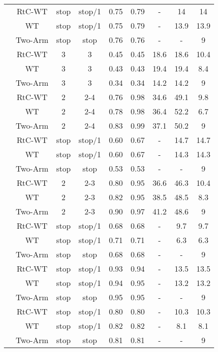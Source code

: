 \begin{longtable}[t]{ccccccccc}
	\cmidrule{1-9}\pagebreak[0]
	& RtC-WT & stop & stop/1 & 0.75 & 0.79 & - & 14 & 14\\
	\nopagebreak
	& WT & stop & stop/1 & 0.75 & 0.79 & - & 13.9 & 13.9\\
	\nopagebreak
	\multirow{-3}{*}{\centering\arraybackslash 8} & Two-Arm & stop & stop & 0.76 & 0.76 & - & - & 9\\
	\cmidrule{1-9}\pagebreak[0]
	& RtC-WT & 3 & 3 & 0.45 & 0.45 & 18.6 & 18.6 & 10.4\\
	\nopagebreak
	& WT & 3 & 3 & 0.43 & 0.43 & 19.4 & 19.4 & 8.4\\
	\nopagebreak
	\multirow{-3}{*}{\centering\arraybackslash 9} & Two-Arm & 3 & 3 & 0.34 & 0.34 & 14.2 & 14.2 & 9\\
	\cmidrule{1-9}\pagebreak[0]
	& RtC-WT & 2 & 2-4 & 0.76 & 0.98 & 34.6 & 49.1 & 9.8\\
	\nopagebreak
	& WT & 2 & 2-4 & 0.78 & 0.98 & 36.4 & 52.2 & 6.7\\
	\nopagebreak
	\multirow{-3}{*}{\centering\arraybackslash 10} & Two-Arm & 2 & 2-4 & 0.83 & 0.99 & 37.1 & 50.2 & 9\\
	\cmidrule{1-9}\pagebreak[0]
	& RtC-WT & stop & stop/1 & 0.60 & 0.67 & - & 14.7 & 14.7\\
	\nopagebreak
	& WT & stop & stop/1 & 0.60 & 0.67 & - & 14.3 & 14.3\\
	\nopagebreak
	\multirow{-3}{*}{\centering\arraybackslash 11} & Two-Arm & stop & stop & 0.53 & 0.53 & - & - & 9\\
	\cmidrule{1-9}\pagebreak[0]
	& RtC-WT & 2 & 2-3 & 0.80 & 0.95 & 36.6 & 46.3 & 10.4\\
	\nopagebreak
	& WT & 2 & 2-3 & 0.82 & 0.95 & 38.5 & 48.5 & 8.3\\
	\nopagebreak
	\multirow{-3}{*}{\centering\arraybackslash 12} & Two-Arm & 2 & 2-3 & 0.90 & 0.97 & 41.2 & 48.6 & 9\\
	\cmidrule{1-9}\pagebreak[0]
	& RtC-WT & stop & stop/1 & 0.68 & 0.68 & - & 9.7 & 9.7\\
	\nopagebreak
	& WT & stop & stop/1 & 0.71 & 0.71 & - & 6.3 & 6.3\\
	\nopagebreak
	\multirow{-3}{*}{\centering\arraybackslash 13} & Two-Arm & stop & stop & 0.68 & 0.68 & - & - & 9\\
	\cmidrule{1-9}\pagebreak[0]
	& RtC-WT & stop & stop/1 & 0.93 & 0.94 & - & 13.5 & 13.5\\
	\nopagebreak
	& WT & stop & stop/1 & 0.94 & 0.95 & - & 13.2 & 13.2\\
	\nopagebreak
	\multirow{-3}{*}{\centering\arraybackslash 14} & Two-Arm & stop & stop & 0.95 & 0.95 & - & - & 9\\
	\cmidrule{1-9}\pagebreak[0]
	& RtC-WT & stop & stop/1 & 0.80 & 0.80 & - & 10.3 & 10.3\\
	\nopagebreak
	& WT & stop & stop/1 & 0.82 & 0.82 & - & 8.1 & 8.1\\
	\nopagebreak
	\multirow{-3}{*}{\centering\arraybackslash 15} & Two-Arm & stop & stop & 0.81 & 0.81 & - & - & 9\\*
\end{longtable}
\endgroup{}

